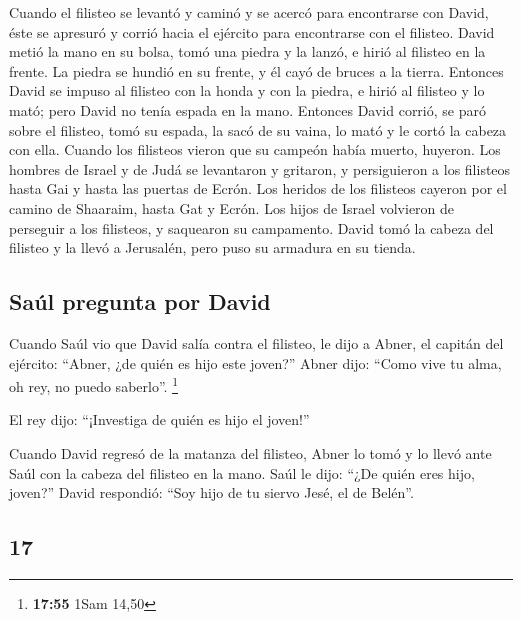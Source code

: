 \begin{paracol}{2}
 Cuando el filisteo se levantó y caminó y se acercó para
encontrarse con David, éste se apresuró y corrió hacia el ejército para
encontrarse con el filisteo.  David metió la mano en su
bolsa, tomó una piedra y la lanzó, e hirió al filisteo en la frente. La
piedra se hundió en su frente, y él cayó de bruces a la tierra.
 Entonces David se impuso al filisteo con la honda y con
la piedra, e hirió al filisteo y lo mató; pero David no tenía espada en
la mano.  Entonces David corrió, se paró sobre el
filisteo, tomó su espada, la sacó de su vaina, lo mató y le cortó la
cabeza con ella. Cuando los filisteos vieron que su campeón había
muerto, huyeron.  Los hombres de Israel y de Judá se
levantaron y gritaron, y persiguieron a los filisteos hasta Gai y hasta
las puertas de Ecrón. Los heridos de los filisteos cayeron por el camino
de Shaaraim, hasta Gat y Ecrón.  Los hijos de Israel
volvieron de perseguir a los filisteos, y saquearon su campamento.
 David tomó la cabeza del filisteo y la llevó a
Jerusalén, pero puso su armadura en su tienda.

\hypertarget{sauxfal-pregunta-por-david}{%
\subsection{Saúl pregunta por David}\label{sauxfal-pregunta-por-david}}

 Cuando Saúl vio que David salía contra el filisteo, le
dijo a Abner, el capitán del ejército: ``Abner, ¿de quién es hijo este
joven?'' Abner dijo: ``Como vive tu alma, oh rey, no puedo saberlo''.
\footnote{\textbf{17:55} 1Sam 14,50}

 El rey dijo: ``¡Investiga de quién es hijo el joven!''

 Cuando David regresó de la matanza del filisteo, Abner
lo tomó y lo llevó ante Saúl con la cabeza del filisteo en la mano.
 Saúl le dijo: ``¿De quién eres hijo, joven?'' David
respondió: ``Soy hijo de tu siervo Jesé, el de Belén''.

\switchcolumn
\begin{otherlanguage}{english}

\hypertarget{section-33}{%
\section{17}\label{section-33}}


\end{otherlanguage}
\end{paracol}

